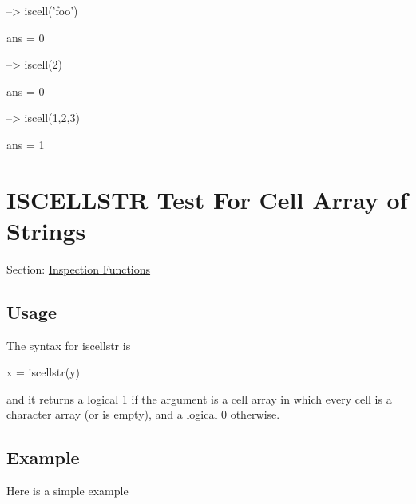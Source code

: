 \begin{DoxyVerbInclude}
--> iscell('foo')

ans = 
 0 

--> iscell(2)

ans = 
 0 

--> iscell({1,2,3})

ans = 
 1 
\end{DoxyVerbInclude}
 \hypertarget{inspection_iscellstr}{}\section{I\-S\-C\-E\-L\-L\-S\-T\-R Test For Cell Array of Strings}\label{inspection_iscellstr}
Section\-: \hyperlink{sec_inspection}{Inspection Functions} \hypertarget{vtkwidgets_vtkxyplotwidget_Usage}{}\subsection{Usage}\label{vtkwidgets_vtkxyplotwidget_Usage}
The syntax for {\ttfamily iscellstr} is \begin{DoxyVerb}   x = iscellstr(y)
\end{DoxyVerb}
 and it returns a logical 1 if the argument is a cell array in which every cell is a character array (or is empty), and a logical 0 otherwise. \hypertarget{variables_struct_Example}{}\subsection{Example}\label{variables_struct_Example}
Here is a simple example


